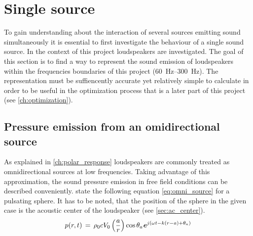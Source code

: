 \section{Single source}\label{ch:single_speaker_source}
To gain understanding about the interaction of several sources emitting sound simultaneously it is essential to first investigate the behaviour of a single sound source. In the context of this project loudspeakers are investigated. The goal of this section is to find a way to represent the sound emission of loudspeakers within the frequencies boundaries of this project (\SIrange{60}{300}{\hertz}).
The representation must be suffiencently accurate yet relatively simple to calculate in order to be useful in the optimization process that is a later part of this project (see \autoref{ch:optimization}).

\subsection{Pressure emission from an omidirectional source}\label{ssec:omni}
As explained in \autoref{ch:polar_response} loudspeakers are commonly treated as omnidirectional sources at low frequencies. Taking advantage of this approximation, the sound pressure emission in free field conditions can be described conveniently. \citep[p. 171]{Kinsler2000} state the following equation \autoref{eq:omni_source} for a pulsating sphere. It has to be noted, that the position of the sphere in the given case is the acoustic center of the loudspeaker (see \autoref{sec:ac_center}).
\begin{equation}\label{eq:omni_source}
p(r,t)\,=\,\rho_0 c V_0 \left(\frac{a}{r}\right)\cos \theta_a \textbf{\textit{e}}^{j\left(\omega t - k(r-a)+\theta_a\right)}
\end{equation}
\startexplain
{}
\stopexplain

